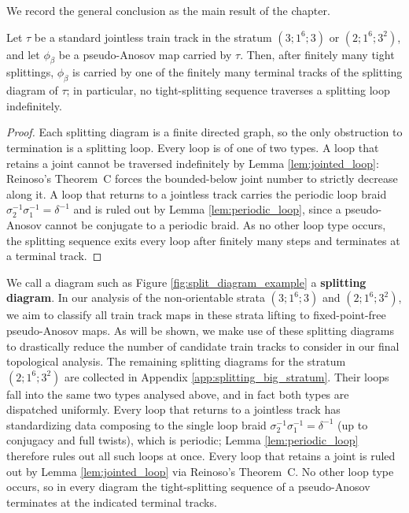 We record the general conclusion as the main result of the chapter.

\begin{theorem}\label{thm:splitting_termination}
Let $\tau$ be a standard jointless train track in the stratum $(3;1^6;3)$ or $(2;1^6;3^2)$, and let $\phi_\beta$ be a pseudo-Anosov map carried by $\tau$. Then, after finitely many tight splittings, $\phi_\beta$ is carried by one of the finitely many terminal tracks of the splitting diagram of $\tau$; in particular, no tight-splitting sequence traverses a splitting loop indefinitely.
\end{theorem}

\begin{proof}
Each splitting diagram is a finite directed graph, so the only obstruction to termination is a splitting loop. Every loop is of one of two types. A loop that retains a joint cannot be traversed indefinitely by Lemma \ref{lem:jointed_loop}: Reinoso's Theorem~C forces the bounded-below joint number to strictly decrease along it. A loop that returns to a jointless track carries the periodic loop braid $\sigma_2^{-1}\sigma_1^{-1} = \delta^{-1}$ and is ruled out by Lemma \ref{lem:periodic_loop}, since a pseudo-Anosov cannot be conjugate to a periodic braid. As no other loop type occurs, the splitting sequence exits every loop after finitely many steps and terminates at a terminal track.
\end{proof}

We call a diagram such as Figure \ref{fig:split_diagram_example} a \textbf{splitting diagram}. In our analysis of the non-orientable strata $(3;1^6;3)$ and $(2;1^6;3^2)$, we aim to classify all train track maps in these strata lifting to fixed-point-free pseudo-Anosov maps. As will be shown, we make use of these splitting diagrams to drastically reduce the number of candidate train tracks to consider in our final topological analysis. The remaining splitting diagrams for the stratum $(2;1^6;3^2)$ are collected in Appendix \ref{app:splitting_big_stratum}. Their loops fall into the same two types analysed above, and in fact both types are dispatched uniformly. Every loop that returns to a jointless track has standardizing data composing to the single loop braid $\sigma_2^{-1}\sigma_1^{-1} = \delta^{-1}$ (up to conjugacy and full twists), which is periodic; Lemma \ref{lem:periodic_loop} therefore rules out all such loops at once. Every loop that retains a joint is ruled out by Lemma \ref{lem:jointed_loop} via Reinoso's Theorem~C. No other loop type occurs, so in every diagram the tight-splitting sequence of a pseudo-Anosov terminates at the indicated terminal tracks.

